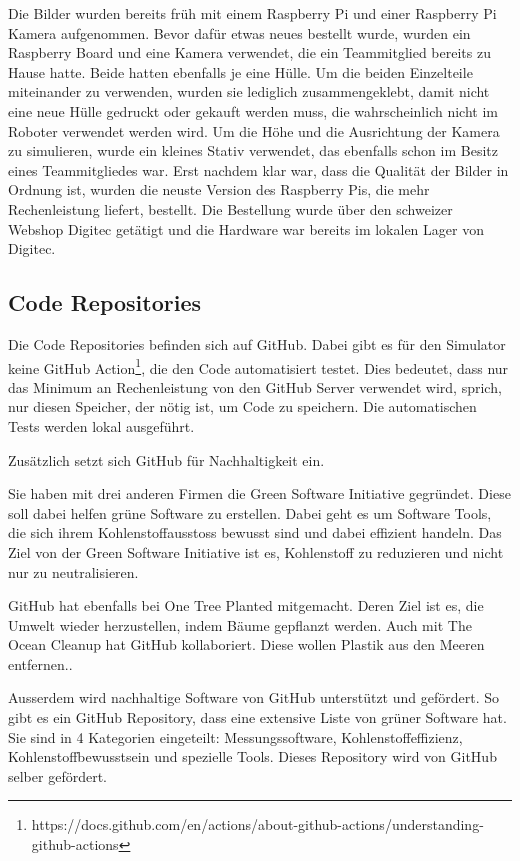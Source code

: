 Die Bilder wurden bereits früh mit einem Raspberry Pi und einer Raspberry Pi Kamera aufgenommen. Bevor dafür etwas neues bestellt wurde, wurden ein Raspberry Board und eine Kamera verwendet, die ein Teammitglied bereits zu Hause hatte. Beide hatten ebenfalls je eine Hülle.
Um die beiden Einzelteile miteinander zu verwenden, wurden sie lediglich zusammengeklebt, damit nicht eine neue Hülle gedruckt oder gekauft werden muss, die wahrscheinlich nicht im Roboter verwendet werden wird.
Um die Höhe und die Ausrichtung der Kamera zu simulieren, wurde ein kleines Stativ verwendet, das ebenfalls schon im Besitz eines Teammitgliedes war.
Erst nachdem klar war, dass die Qualität der Bilder in Ordnung ist, wurden die neuste Version des Raspberry Pis, die mehr Rechenleistung liefert, bestellt. Die Bestellung wurde über den schweizer Webshop Digitec getätigt und die Hardware war bereits im lokalen Lager von Digitec. 

\subsection{Code Repositories}

Die Code Repositories befinden sich auf GitHub. Dabei gibt es für den Simulator keine GitHub Action\footnote{https://docs.github.com/en/actions/about-github-actions/understanding-github-actions}, die den Code automatisiert testet. Dies bedeutet, dass nur das Minimum an Rechenleistung von den GitHub Server verwendet wird, sprich, nur diesen Speicher, der nötig ist, um Code zu speichern. Die automatischen Tests werden lokal ausgeführt.

Zusätzlich setzt sich GitHub für Nachhaltigkeit ein.\cite{github-sustainability}

Sie haben mit drei anderen Firmen die Green Software Initiative gegründet. Diese soll dabei helfen grüne Software zu erstellen.  Dabei geht es um Software Tools, die sich ihrem Kohlenstoffausstoss bewusst sind und dabei effizient handeln. Das Ziel von der Green Software Initiative ist es, Kohlenstoff zu reduzieren und nicht nur zu neutralisieren.\cite{green-software-initiative}

GitHub hat ebenfalls bei One Tree Planted mitgemacht. Deren Ziel ist es, die Umwelt wieder herzustellen, indem Bäume gepflanzt werden\cite{one-tree-planted}. Auch mit The Ocean Cleanup hat GitHub kollaboriert. Diese wollen Plastik aus den Meeren entfernen.\cite{ocean-cleanup}.

Ausserdem wird nachhaltige Software von GitHub unterstützt und gefördert. So gibt es ein GitHub Repository, dass eine extensive Liste von grüner Software hat. Sie sind in 4 Kategorien eingeteilt: Messungssoftware, Kohlenstoffeffizienz, Kohlenstoffbewusstsein und spezielle Tools. Dieses Repository wird von GitHub selber gefördert.\cite{green-software}

